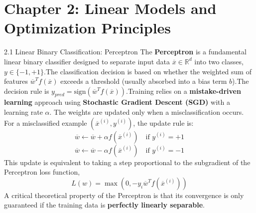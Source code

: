 \documentclass{article}
\begin{document}
\section{Chapter 2: Linear Models and Optimization Principles}
2.1 Linear Binary Classification: Perceptron
The \textbf{Perceptron} is a fundamental linear binary classifier designed to separate input data $\overline{x} \in \mathbb{R}^d$ into two classes, $y \in \{-1, +1\}$.\footnotemark[1] The classification decision is based on whether the weighted sum of features $\overline{w}^T f(\overline{x})$ exceeds a threshold (usually absorbed into a bias term $b$).\footnotemark[1] The decision rule is $y_{pred} = \text{sign}(\overline{w}^T f(\overline{x}))$.\footnotemark[1]
Training relies on a \textbf{mistake-driven learning} approach using \textbf{Stochastic Gradient Descent (SGD)} with a learning rate $\alpha$. The weights are updated only when a misclassification occurs. For a misclassified example $(\overline{x}^{(i)},y^{(i)})$, the update rule is:
$$\overline{w} \leftarrow \overline{w} + \alpha f(\overline{x}^{(i)}) \quad \text{if } y^{(i)}=+1$$
$$\overline{w} \leftarrow \overline{w} - \alpha f(\overline{x}^{(i)}) \quad \text{if } y^{(i)}=-1$$
This update is equivalent to taking a step proportional to the subgradient of the Perceptron loss function,
$$L(w) = \max(0, -y_{i} \overline{w}^{T} f(\overline{x}^{(i)}))$$
\footnotemark[2] A critical theoretical property of the Perceptron is that its convergence is only guaranteed if the training data is \textbf{perfectly linearly separable}.\footnotemark[3]
\end{document}

